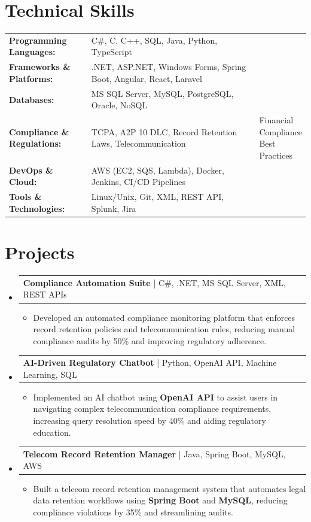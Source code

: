 \documentclass[letterpaper,10pt]{article}
\makeatletter
\newcommand{\resumeItem}[1]{
  \item{\fontsize{8pt}{9pt}\selectfont
    #1 \vspace{-3pt}
  }
}
\newcommand{\resumeProjectHeading}[2]{
    \item
    \begin{tabular*}{1.001\textwidth}{l@{\extracolsep{\fill}}r}
      \fontsize{8.5pt}{10pt}#1 & \textbf{\fontsize{8.5pt}{10pt} #2}\\
    \end{tabular*}\vspace{-7pt}
}
\newcommand{\resumeSubHeadingListStart}{\begin{itemize}[leftmargin=0pt, label={}]}
\newcommand{\resumeSubHeadingListEnd}{\end{itemize}}
\newcommand{\resumeItemListStart}{\begin{itemize}[leftmargin=*]}
\newcommand{\resumeItemListEnd}{\end{itemize}\vspace{-5pt}}
\makeatother
\begin{document}
\section{Technical Skills}
        \vspace{-14pt}
        \begin{table}[h]
            \fontsize{8pt}{9pt}\selectfont
            \begin{tabular}{p{0.3\linewidth} p{0.7\linewidth}}
                \textbf{Programming Languages:} & C\#, C, C++, SQL, Java, Python, TypeScript \\
                \textbf{Frameworks \& Platforms:} & .NET, ASP.NET, Windows Forms, Spring Boot, Angular, React, Laravel \\
                \textbf{Databases:} & MS SQL Server, MySQL, PostgreSQL, Oracle, NoSQL \\
                \textbf{Compliance \& Regulations:} & TCPA, A2P 10 DLC, Record Retention Laws, Telecommunication & Financial Compliance Best Practices \\
                \textbf{DevOps \& Cloud:} & AWS (EC2, SQS, Lambda), Docker, Jenkins, CI/CD Pipelines \\
                \textbf{Tools \& Technologies:} & Linux/Unix, Git, XML, REST API, Splunk, Jira \\
            \end{tabular}
        \end{table}
 \vspace{-18pt}

\section{Projects}
    \vspace{-5pt}
    \resumeSubHeadingListStart
          \resumeProjectHeading
            {\textbf{Compliance Automation Suite} | C\#, .NET, MS SQL Server, XML, REST APIs}{}
            \resumeItemListStart
                \resumeItem{Developed an automated compliance monitoring platform that enforces record retention policies and telecommunication rules, reducing manual compliance audits by 50\% and improving regulatory adherence.}
            \resumeItemListEnd
        \vspace{-12pt}
    
        \resumeProjectHeading
            {\textbf{AI-Driven Regulatory Chatbot} | Python, OpenAI API, Machine Learning, SQL}{}
        \resumeItemListStart
                \resumeItem{Implemented an AI chatbot using \textbf{OpenAI API} to assist users in navigating complex telecommunication compliance requirements, increasing query resolution speed by 40\% and aiding regulatory education.}
        \resumeItemListEnd
      \vspace{-12pt}
      \resumeProjectHeading
        {\textbf{Telecom Record Retention Manager} | Java, Spring Boot, MySQL, AWS}{}
    \resumeItemListStart
            \resumeItem{Built a telecom record retention management system that automates legal data retention workflows using \textbf{Spring Boot} and \textbf{MySQL}, reducing compliance violations by 35\% and streamlining audits.}
    \resumeItemListEnd
    \resumeSubHeadingListEnd
\end{document}
